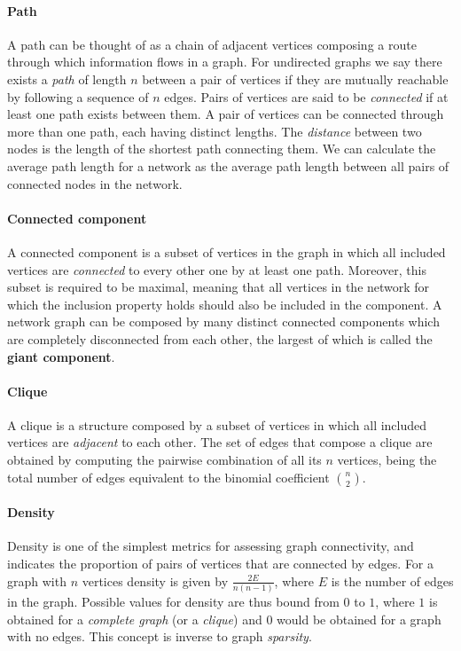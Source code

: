 \paragraph*{Path}
A path can be thought of as a chain of adjacent vertices composing a route through which information flows in a graph.
For undirected graphs we say there exists a \textit{path} of length $n$ between a pair of vertices if they are mutually reachable by following a sequence of $n$ edges.
Pairs of vertices are said to be \textit{connected} if at least one path exists between them.
A pair of vertices can be connected through more than one path, each having distinct lengths.
The \textit{distance} between two nodes is the length of the shortest path connecting them.
We can calculate the average path length for a network as the average path length between all pairs of connected nodes in the network.

\paragraph*{Connected component}
A connected component is a subset of vertices in the graph in which all included vertices are \textit{connected} to every other one by at least one path.
Moreover, this subset is required to be maximal, meaning that all vertices in the network for which the inclusion property holds should also be included in the component. 
A network graph can be composed by many distinct connected components which are completely disconnected from each other, the largest of which is called the \textbf{giant component}.

\paragraph*{Clique}
A clique is a structure composed by a subset of vertices in which all included vertices are \textit{adjacent} to each other.
The set of edges that compose a clique are obtained by computing the pairwise combination of all its $n$ vertices, being the total number of edges equivalent to the binomial coefficient $\binom{n}{2}$.

\paragraph*{Density}
Density is one of the simplest metrics for assessing graph connectivity, and indicates the proportion of pairs of vertices that are connected by edges.
For a graph with $n$ vertices density is given by $\frac{2E}{n(n-1)}$, where $E$ is the number of edges in the graph.
Possible values for density are thus bound from $0$ to $1$, where $1$ is obtained for a \textit{complete graph} (or a \textit{clique}) and $0$ would be obtained for a graph with no edges.
This concept is inverse to graph \textit{sparsity}. 

